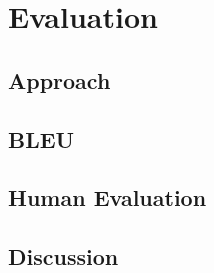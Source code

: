 \chapter{Evaluation}
\section{Approach}
\section{BLEU}
\section{Human Evaluation}
\section{Discussion}
